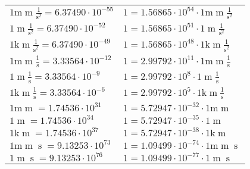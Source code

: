 \begin{center}
\begin{longtable}{l l}
{\color{gray}$1 \bm{\mathrm{ m}}{\operatorname{m}}\frac1{\operatorname{s}^2}{}{} = 6.37490\cdot10^{-55} $}   & {\color{gray}$ 1 = 1.56865\cdot10^{54} \cdot 1 \bm{\mathrm{ m}}{\operatorname{m}}\frac1{\operatorname{s}^2}{}{}$}  \\
{\color{black}$1 \bm{\mathrm{ }}{\operatorname{m}}\frac1{\operatorname{s}^2}{}{} = 6.37490\cdot10^{-52} $}   & {\color{black}$ 1 = 1.56865\cdot10^{51} \cdot 1 \bm{\mathrm{ }}{\operatorname{m}}\frac1{\operatorname{s}^2}{}{}$}  \\
{\color{gray}$1 \bm{\mathrm{ k}}{\operatorname{m}}\frac1{\operatorname{s}^2}{}{} = 6.37490\cdot10^{-49} $}   & {\color{gray}$ 1 = 1.56865\cdot10^{48} \cdot 1 \bm{\mathrm{ k}}{\operatorname{m}}\frac1{\operatorname{s}^2}{}{}$}  \\
{\color{gray}$1 \bm{\mathrm{ m}}{\operatorname{m}}\frac1{\operatorname{s}}{}{} = 3.33564\cdot10^{-12} $}   & {\color{gray}$ 1 = 2.99792\cdot10^{11} \cdot 1 \bm{\mathrm{ m}}{\operatorname{m}}\frac1{\operatorname{s}}{}{}$}  \\
{\color{black}$1 \bm{\mathrm{ }}{\operatorname{m}}\frac1{\operatorname{s}}{}{} = 3.33564\cdot10^{-9} $}   & {\color{black}$ 1 = 2.99792\cdot10^{8} \cdot 1 \bm{\mathrm{ }}{\operatorname{m}}\frac1{\operatorname{s}}{}{}$}  \\
{\color{gray}$1 \bm{\mathrm{ k}}{\operatorname{m}}\frac1{\operatorname{s}}{}{} = 3.33564\cdot10^{-6} $}   & {\color{gray}$ 1 = 2.99792\cdot10^{5} \cdot 1 \bm{\mathrm{ k}}{\operatorname{m}}\frac1{\operatorname{s}}{}{}$}  \\
{\color{gray}$1 \bm{\mathrm{ m}}{\operatorname{m}}{}{}{} = 1.74536\cdot10^{31} $}   & {\color{gray}$ 1 = 5.72947\cdot10^{-32} \cdot 1 \bm{\mathrm{ m}}{\operatorname{m}}{}{}{}$}  \\
{\color{black}$1 \bm{\mathrm{ }}{\operatorname{m}}{}{}{} = 1.74536\cdot10^{34} $}   & {\color{black}$ 1 = 5.72947\cdot10^{-35} \cdot 1 \bm{\mathrm{ }}{\operatorname{m}}{}{}{}$}  \\
{\color{gray}$1 \bm{\mathrm{ k}}{\operatorname{m}}{}{}{} = 1.74536\cdot10^{37} $}   & {\color{gray}$ 1 = 5.72947\cdot10^{-38} \cdot 1 \bm{\mathrm{ k}}{\operatorname{m}}{}{}{}$}  \\
{\color{gray}$1 \bm{\mathrm{ m}}{\operatorname{m}}{\operatorname{s}}{}{} = 9.13253\cdot10^{73} $}   & {\color{gray}$ 1 = 1.09499\cdot10^{-74} \cdot 1 \bm{\mathrm{ m}}{\operatorname{m}}{\operatorname{s}}{}{}$}  \\
{\color{black}$1 \bm{\mathrm{ }}{\operatorname{m}}{\operatorname{s}}{}{} = 9.13253\cdot10^{76} $}   & {\color{black}$ 1 = 1.09499\cdot10^{-77} \cdot 1 \bm{\mathrm{ }}{\operatorname{m}}{\operatorname{s}}{}{}$}  \\

\end{longtable}
\end{center}
